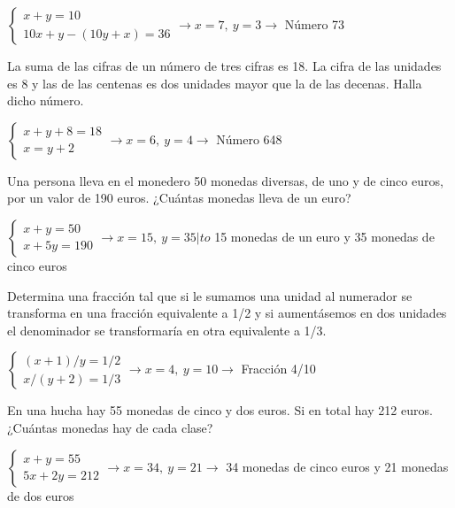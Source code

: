 \documentclass[spanish, 11pt]{exam}
\begin{document}
\begin{questions}
\begin{solution}  $\left\{\begin{matrix}x+y=10 \\ 10x+y-(10y+x)=36\end{matrix}\right. \to  x = 7, \  y = 3 \to$ Número 73\end{solution}

\question La suma de las cifras de un número de tres cifras es 18. La cifra de las unidades es 8 y las de las centenas es dos unidades mayor que la de las decenas. Halla dicho número. 
\begin{solution} $\left\{\begin{matrix}x+y+8=18 \\ x=y+2\end{matrix}\right. \to  x = 6, \  y = 4 \to$ Número 648 \end{solution}

\question Una persona lleva en el monedero 50 monedas diversas, de uno y de cinco euros, por un valor de 190 euros. ¿Cuántas monedas lleva de un euro?
\begin{solution} $\left\{\begin{matrix}x+y=50 \\ x+5y=190\end{matrix}\right. \to  x = 15, \  y = 35 |to$ 15 monedas de un euro y 35 monedas de cinco euros \end{solution}

\question Determina una fracción tal que si le sumamos una unidad al numerador se transforma en una fracción equivalente a 1/2 y si aumentásemos en dos unidades el denominador se transformaría en otra equivalente a 1/3.

\begin{solution} $\left\{\begin{matrix}(x+1)/y=1/2 \\ x/(y+2)=1/3\end{matrix}\right. \to  x = 4, \  y = 10 \to$ Fracción 4/10 \end{solution}

\question En una hucha hay 55 monedas de cinco y dos euros. Si en total hay 212 euros. ¿Cuántas monedas hay de cada clase?
\begin{solution} $\left\{\begin{matrix}x+y=55 \\ 5x+2y=212\end{matrix}\right. \to  x = 34, \  y = 21 \to$ 34 monedas de cinco euros y 21 monedas de dos euros \end{solution}


\end{questions}
\end{document}
